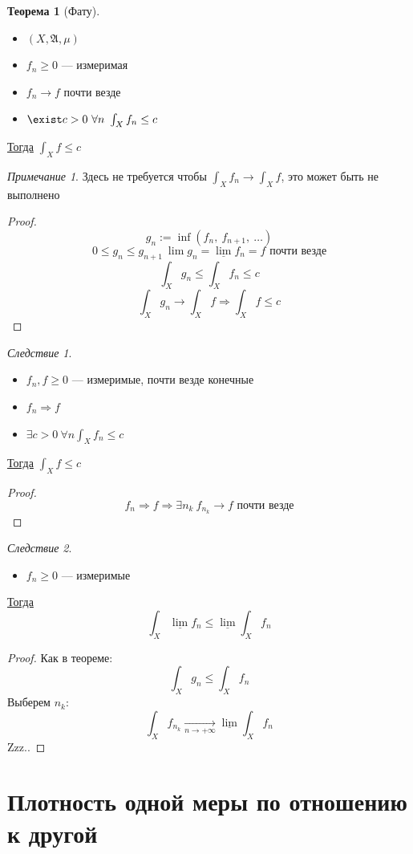 \documentclass[oneside]{book}
\newcommand{\A}{\mathfrak{A}}
\theoremstyle{plain}
\theoremstyle{remark}
\newtheorem*{remark}{Примечание}
\newtheorem{corollary}{Следствие}[theorem]
\theoremstyle{definition}
\newtheorem{theorem}{Теорема}[section]
\begin{document}
\begin{theorem}[Фату]
\begin{itemize}
\item \((X, \A, \mu)\)
\item \(f_n \ge 0\) --- измеримая
\item \(f_n \to f\) почти везде
\item \(\exist c > 0\ \forall n\ \int_X f_n \le c\)
\end{itemize}
\uline{Тогда} \(\int_X f \le c\) \\
\end{theorem}
\begin{remark}
Здесь не требуется чтобы \(\int_X f_n \to \int_X f\), это может быть не выполнено
\end{remark}
\begin{proof}
\[ g_n := \inf(f_n,\ f_{n + 1},\ \dots) \]
\[ 0 \le g_n \le g_{n + 1}\ \lim g_n = \underline{\lim} f_n = f\text{ почти везде} \]
\[ \int_X g_n \le \int_X f_n \le c \]
\[ \int_X g_n \to \int_X f \Rightarrow \int_X f \le c \]
\end{proof}
\begin{corollary}
\-
\begin{itemize}
\item \(f_n, f \ge 0\) --- измеримые, почти везде конечные
\item \(f_n \Rightarrow f\)
\item \(\exists c >0\ \forall n \int_X f_n \le c\)
\end{itemize}
\uline{Тогда} \(\int_X f \le c\)
\end{corollary}
\begin{proof}
\[ f_n \Rightarrow f \Rightarrow \exists n_k\ f_{n_k} \to f\text{ почти везде} \]
\end{proof}

\begin{corollary}
\-
\begin{itemize}
\item \(f_n \ge 0\) --- измеримые
\end{itemize}
\uline{Тогда} \[ \int_X \underline{\lim}f_n \le \underline{\lim}\int_X f_n \]
\end{corollary}
\begin{proof}
Как в теореме: \[ \int_X g_n \le \int_X f_n \]
Выберем \(n_k\): \[ \int_X f_{n_k} \xrightarrow[n \to + \infty]{} \underline{\lim}\int_X f_n \]
\color{red}Zzz..\color{black}
\end{proof}
\section{Плотность одной меры по отношению к другой}
\label{sec:org1505d20}
\end{document}

